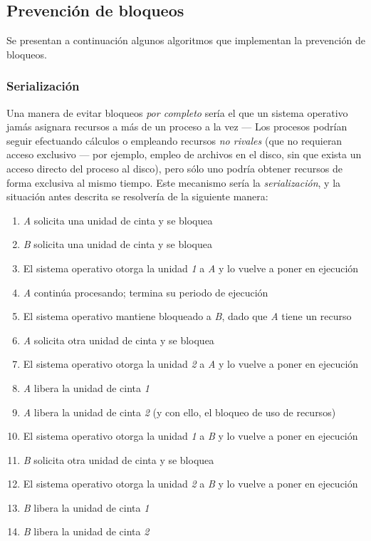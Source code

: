 \documentclass[11pt,fleqn]{book} %
\begin{document}
\subsection{Prevención de bloqueos}
\label{sec-3-4-1}


Se presentan a continuación algunos algoritmos que implementan la
prevención de bloqueos.
\subsubsection{Serialización}
\label{sec-3-4-1-1}


Una manera de evitar bloqueos \emph{por completo} sería el que un sistema
operativo jamás asignara recursos a más de un proceso a la vez — Los
procesos podrían seguir efectuando cálculos o empleando recursos \emph{no rivales} (que no requieran acceso exclusivo — por ejemplo, empleo de
archivos en el disco, sin que exista un acceso directo del proceso al
disco), pero sólo uno podría obtener recursos de forma exclusiva al
mismo tiempo. Este mecanismo sería la \emph{serialización}, y la situación
antes descrita se resolvería de la siguiente manera:

\begin{enumerate}
\item \emph{A} solicita una unidad de cinta y se bloquea
\item \emph{B} solicita una unidad de cinta y se bloquea
\item El sistema operativo otorga la unidad \emph{1} a \emph{A} y lo vuelve a poner
   en ejecución
\item \emph{A} continúa procesando; termina su periodo de ejecución
\item El sistema operativo mantiene bloqueado a \emph{B}, dado que \emph{A} tiene
   un recurso
\item \emph{A} solicita otra unidad de cinta y se bloquea
\item El sistema operativo otorga la unidad \emph{2} a \emph{A} y lo vuelve a poner
   en ejecución
\item \emph{A} libera la unidad de cinta \emph{1}
\item \emph{A} libera la unidad de cinta \emph{2} (y con ello, el bloqueo de uso de
   recursos)
\item El sistema operativo otorga la unidad \emph{1} a \emph{B} y lo vuelve a
    poner en ejecución
\item \emph{B} solicita otra unidad de cinta y se bloquea
\item El sistema operativo otorga la unidad \emph{2} a \emph{B} y lo vuelve a
    poner en ejecución
\item \emph{B} libera la unidad de cinta \emph{1}
\item \emph{B} libera la unidad de cinta \emph{2}
\end{enumerate}
\end{document}
